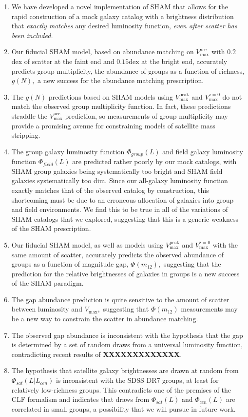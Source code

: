 \documentclass[usenatbib,usegraphicx,letterpaper]{mn2e}
\newcommand{\ben}{\begin{enumerate}}
\newcommand{\een}{\end{enumerate}}
\newcommand{\monetwo}{m_{12}}
\newcommand{\vpeak}{V_{\mathrm{max}}^{\mathrm{peak}}}
\newcommand{\vmax}{V_{\mathrm{max}}}
\newcommand{\vacc}{V_{\mathrm{max}}^{\mathrm{acc}}}
\newcommand{\vzero}{V_{\mathrm{max}}^{\mathrm{z=0}}}
\begin{document}
\ben
\item We have developed a novel implementation of SHAM that allows for
the rapid construction of a mock galaxy catalog with a brightness
distribution that {\em exactly matches} any desired luminosity
function, {\em even after scatter has been included.} 
\item Our fiducial SHAM model, based on abundance matching on $\vacc$
with $0.2$dex of scatter at the faint end and $0.15$dex at the bright
end, accurately predicts group multiplicity, the abundance of groups
as a function of richness, $g(N),$ a new success for the abundance
matching prescription.
\item The $g(N)$ predictions based on SHAM models using $\vpeak$
and $\vzero$ do not match the observed group multiplicity function.  
In fact, these predictions straddle the $\vacc$ prediction, 
so measurements of group multiplicity may provide 
a promising avenue for constraining models of
satellite mass stripping.
\item The group galaxy luminosity function $\Phi_{group}(L)$ and field
galaxy luminosity function $\Phi_{field}(L)$ are predicted rather
poorly by our mock catalogs, with SHAM group galaxies being
systematically too bright and SHAM field galaxies systematically too
dim. Since our all-galaxy luminosity function exactly matches that of
the observed catalog by construction, this shortcoming must be due to
an erroneous allocation of galaxies into group and field environments. 
We find this to be true in all of the variations of SHAM
catalogs that we explored, suggesting that this is a generic
weakness of the SHAM prescription.
\item Our fiducial SHAM model, as well as models using $\vpeak$ and
$\vzero$ with the same amount of scatter, accurately predicts the
observed abundance of groups as a function of magnitude gap,
$\Phi(\monetwo),$ suggesting that the prediction for the relative 
brightnesses of galaxies in groups is a new success of the SHAM
paradigm.
\item The gap abundance prediction is quite sensitive to the amount of
scatter between luminosity and $\vmax,$ suggesting that
$\Phi(\monetwo)$ measurements may be a new way to constrain the
scatter in abundance matching.
\item The observed gap abundance is inconsistent with the hypothesis
that the gap is determined by a set of random draws from a universal
luminosity function, contradicting recent results of {\bf XXXXXXXXXXXXX}.
\item The hypothesis that satellite galaxy brightnesses are drawn at
random from $\Phi_{sat}(L|L_{cen})$ is inconsistent with the SDSS DR7 
groups, at least for relatively low-richness groups. This contradicts 
one of the premises of the CLF formalism and indicates that draws from
$\Phi_{sat}(L)$ and $\Phi_{cen}(L)$ are correlated in small groups, a
possibility that we will pursue in future work.  
\een
\end{document}
